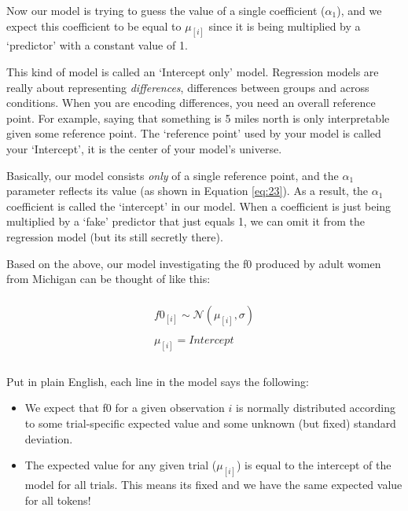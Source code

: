 \documentclass[
]{book}
\begin{document}
Now our model is trying to guess the value of a single coefficient (\(\alpha_1\)), and we expect this coefficient to be equal to \(\mu_{[i]}\) since it is being multiplied by a `predictor' with a constant value of 1.

This kind of model is called an `Intercept only' model. Regression models are really about representing \emph{differences}, differences between groups and across conditions. When you are encoding differences, you need an overall reference point. For example, saying that something is 5 miles north is only interpretable given some reference point. The `reference point' used by your model is called your `Intercept', it is the center of your model's universe.

Basically, our model consists \emph{only} of a single reference point, and the \(\alpha_1\) parameter reflects its value (as shown in Equation \eqref{eq:23}). As a result, the \(\alpha_1\) coefficient is called the `intercept' in our model. When a coefficient is just being multiplied by a `fake' predictor that just equals 1, we can omit it from the regression model (but its still secretly there).

Based on the above, our model investigating the f0 produced by adult women from Michigan can be thought of like this:

\begin{equation}
\begin{split}
\\
f0_{[i]} \sim \mathcal{N}(\mu_{[i]},\sigma) \\ \\ 
\mu_{[i]} = Intercept \\ \\
\end{split}
\label{eq:24}
\end{equation}

Put in plain English, each line in the model says the following:

\begin{itemize}
\item
  We expect that f0 for a given observation \(i\) is normally distributed according to some trial-specific expected value and some unknown (but fixed) standard deviation.
\item
  The expected value for any given trial (\(\mu_{[i]}\)) is equal to the intercept of the model for all trials. This means its fixed and we have the same expected value for all tokens!
\end{itemize}
\end{document}
